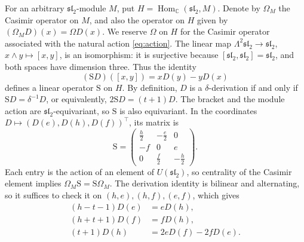 \documentclass[11pt,reqno]{amsart}
\numberwithin{equation}{section}
\newcommand{\C}{\mathbb C}
\newcommand{\s}{\mathfrak{sl}_2}
\DeclareMathOperator{\Hom}{Hom}
\theoremstyle{definition}
\theoremstyle{remark}
\begin{document}
For an arbitrary \(\s\)-module \(M\), put
\(H=\Hom_\C(\s,M)\). Denote by \(\Omega_M\) the Casimir operator
on \(M\), and also the operator on \(H\) given by
\((\Omega_MD)(x)=\Omega D(x)\). We reserve \(\Omega\) on \(H\)
for the Casimir operator associated with the natural action
\eqref{eq:action}. The linear map \(\Lambda^2\s\to\s\),
\(x\wedge y\mapsto[x,y]\), is an isomorphism: it is surjective
because \([\s,\s]=\s\), and both spaces have dimension three.
Thus the identity
\begin{equation}\label{eq:Sdef}
(\mathrm{S}D)([x,y])=xD(y)-yD(x)
\end{equation}
defines a linear operator \(\mathrm{S}\) on \(H\). By definition,
\(D\) is a \(\delta\)-derivation if and only if
\(\mathrm{S}D=\delta^{-1}D\), or equivalently,
\(2\mathrm{S}D=(t+1)D\). The bracket and the module action are
\(\s\)-equivariant, so \(\mathrm{S}\) is also equivariant.
In the coordinates \(D\mapsto(D(e),D(h),D(f))^{\top}\),
its matrix is
\begin{equation}\label{eq:Smatrix}
\mathrm{S}=\begin{pmatrix}
\frac{h}{2}&-\frac{e}{2}&0\\
-f&0&e\\
0&\frac{f}{2}&-\frac{h}{2}
\end{pmatrix}.
\end{equation}
Each entry is the action of an element of \(U(\s)\), so centrality
of the Casimir element implies \(\Omega_M\mathrm{S}=\mathrm{S}\Omega_M\).
The derivation identity is bilinear and alternating, so it suffices
to check it on \((h,e),(h,f),(e,f)\), which gives
\begin{equation}\label{eq:basis-equations}
\begin{aligned}
(h-t-1)D(e)&=eD(h),\\
(h+t+1)D(f)&=fD(h),\\
(t+1)D(h)&=2eD(f)-2fD(e).
\end{aligned}
\end{equation}
\end{document}
